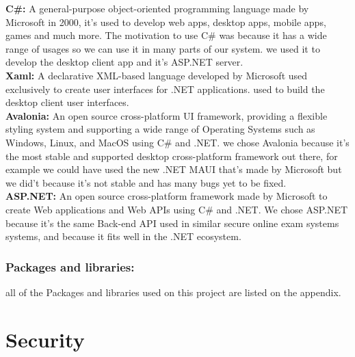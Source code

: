 \documentclass[]{uc2pfecaneva}
\begin{document}
    \noindent
    \textbf{C\#: } A general-purpose object-oriented programming language made by Microsoft in 2000, it’s used to develop web apps, desktop apps, mobile apps, games and much more.
    The motivation to use C\#  was because it has a wide range of usages so we can use it in many parts of our system.
    we used it to develop the desktop client app and it's ASP.NET server. \\

    \noindent
    \textbf{Xaml: } A declarative XML-based language developed by Microsoft used exclusively to create user interfaces for .NET applications.
    used to build the desktop client user interfaces.\\

    \noindent
    \textbf{Avalonia: } An open source cross-platform UI framework, providing a flexible styling system and supporting a wide range of Operating Systems such as Windows, Linux, and MacOS using C# and .NET.
    we chose Avalonia because it’s the most stable and supported desktop cross-platform framework out there, for example we could have used the new .NET MAUI that’s made by Microsoft but we did’t because it’s not stable and has many bugs yet to be fixed.\\

    \noindent
    \textbf{ASP.NET: }  An open source cross-platform framework made by Microsoft to create Web applications and Web APIs using C# and .NET. We chose ASP.NET because it’s the same Back-end API used in similar secure online exam systems systems, and because it fits well in the .NET ecosystem. \\

    \subsubsection{Packages and libraries: }
      all of the Packages and libraries used on this project are listed on the appendix.

    \section{Security}
\end{document}

